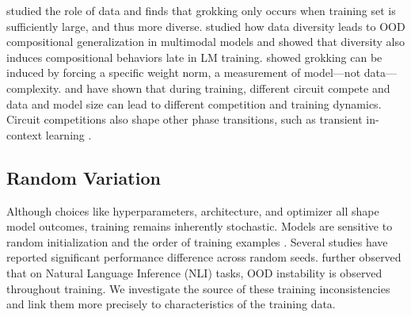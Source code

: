 \citet{Zhu2024-nz} studied the role of data and finds that grokking only occurs when training set is sufficiently large, and thus more diverse. \citet{Berlot-Attwell2023-qx} studied how data diversity leads to OOD compositional generalization in multimodal models and 
\citet{Lubana2024-ed} showed that diversity also induces compositional behaviors late in LM training.
\citet{Liu2022-mj} showed grokking can be induced by forcing a specific weight norm, a measurement of model---not data---complexity. 
\citet{Huang2024-aw} and \citet{Varma2023-iq} have shown that during training, different circuit compete and data and model size can lead to different competition and training dynamics. Circuit competitions also shape other phase transitions, such as transient in-context learning \citep{Park2024-ri}.


\subsection{Random Variation} 
Although choices like hyperparameters, architecture, and optimizer all shape model outcomes, training remains inherently stochastic. Models are sensitive to random initialization and the order of training examples \cite{Dodge2020-pb}. Several studies \citep{Zhou2020-xt, D-Amour2022-tl, Naik2018-og} have reported significant performance difference across random seeds. \citet{Zhou2020-xt} further observed that on Natural Language Inference (NLI) tasks, OOD instability is observed throughout training. We investigate the source of these training inconsistencies and link them more precisely to characteristics of the training data. 



